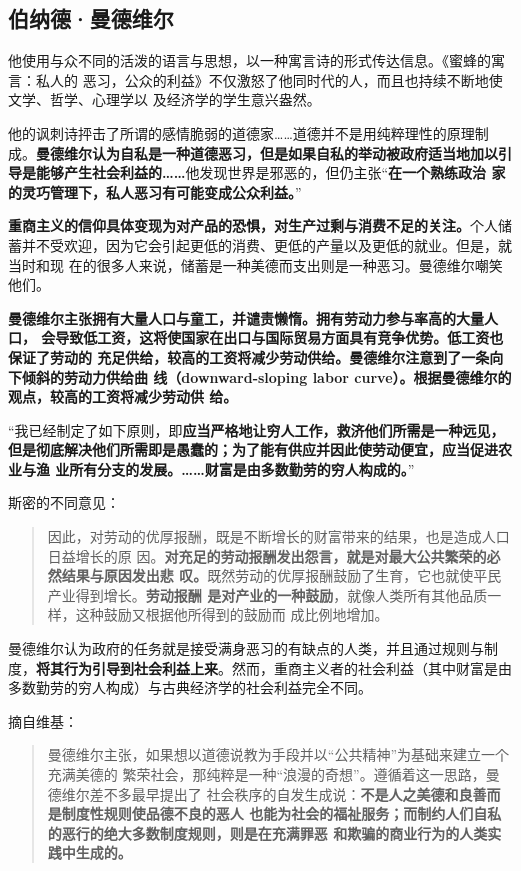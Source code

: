 \subsection{伯纳德·曼德维尔}

他使用与众不同的活泼的语言与思想，以一种寓言诗的形式传达信息。《蜜蜂的寓言：私人的
恶习，公众的利益》不仅激怒了他同时代的人，而且也持续不断地使文学、哲学、心理学以
及经济学的学生意兴盎然。

他的讽刺诗抨击了所谓的感情脆弱的道德家……道德并不是用纯粹理性的原理制
成。\textbf{曼德维尔认为自私是一种道德恶习，但是如果自私的举动被政府适当地加以引
  导是能够产生社会利益的……}他发现世界是邪恶的，但仍主张“\textbf{在一个熟练政治
  家的灵巧管理下，私人恶习有可能变成公众利益。}”

\textbf{重商主义的信仰具体变现为对产品的恐惧，对生产过剩与消费不足的关注。}个人储
蓄并不受欢迎，因为它会引起更低的消费、更低的产量以及更低的就业。但是，就当时和现
在的很多人来说，储蓄是一种美德而支出则是一种恶习。曼德维尔嘲笑他们。

\textbf{曼德维尔主张拥有大量人口与童工，并谴责懒惰。拥有劳动力参与率高的大量人口，
  会导致低工资，这将使国家在出口与国际贸易方面具有竞争优势。低工资也保证了劳动的
  充足供给，较高的工资将减少劳动供给。曼德维尔注意到了一条向下倾斜的劳动力供给曲
  线（downward-sloping labor curve）。根据曼德维尔的观点，较高的工资将减少劳动供
  给。}

“我已经制定了如下原则，即\textbf{应当严格地让穷人工作，救济他们所需是一种远见，
  但是彻底解决他们所需即是愚蠢的；为了能有供应并因此使劳动便宜，应当促进农业与渔
  业所有分支的发展。……财富是由多数勤劳的穷人构成的。}”

斯密的不同意见：
\begin{quotation}
  因此，对劳动的优厚报酬，既是不断增长的财富带来的结果，也是造成人口日益增长的原
  因。\textbf{对充足的劳动报酬发出怨言，就是对最大公共繁荣的必然结果与原因发出悲
    叹。}既然劳动的优厚报酬鼓励了生育，它也就使平民产业得到增长。\textbf{劳动报酬
    是对产业的一种鼓励}，就像人类所有其他品质一样，这种鼓励又根据他所得到的鼓励而
  成比例地增加。
\end{quotation}

曼德维尔认为政府的任务就是接受满身恶习的有缺点的人类，并且通过规则与制
度，\textbf{将其行为引导到社会利益上来}。然而，重商主义者的社会利益（其中财富是由
多数勤劳的穷人构成）与古典经济学的社会利益完全不同。

摘自维基：
\begin{quotation}
  曼德维尔主张，如果想以道德说教为手段并以“公共精神”为基础来建立一个充满美德的
  繁荣社会，那纯粹是一种“浪漫的奇想”。遵循着这一思路，曼德维尔差不多最早提出了
  社会秩序的自发生成说：\textbf{不是人之美德和良善而是制度性规则使品德不良的恶人
    也能为社会的福祉服务；而制约人们自私的恶行的绝大多数制度规则，则是在充满罪恶
    和欺骗的商业行为的人类实践中生成的。}
\end{quotation}

